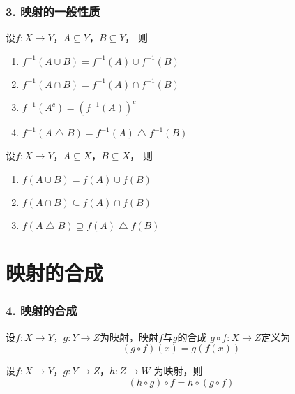 \documentclass{beamer}
\begin{document}
\begin{CJK*}{UTF8}{gbsn}
\begin{frame}
  \frametitle{3. 映射的一般性质}
  \begin{Thm}
    设$f:X\to Y$，$A \subseteq Y$，$B \subseteq Y$， 则
    \begin{enumerate}[(1)]
    \item $f^{-1}(A \cup B) = f^{-1}(A) \cup f^{-1}(B)$
    \item $f^{-1}(A \cap B) = f^{-1}(A) \cap f^{-1}(B)$
    \item $f^{-1}(A^c)=(f^{-1}(A))^c$
    \item $f^{-1}(A \bigtriangleup B) = f^{-1}(A) \bigtriangleup f^{-1}(B)$
    \end{enumerate}
  \end{Thm}
    \begin{Thm}
    设$f:X\to Y$，$A \subseteq X$，$B \subseteq X$， 则
    \begin{enumerate}[(1)]
    \item $f(A \cup B) = f(A) \cup f(B)$
    \item $f(A \cap B) \subseteq f(A) \cap f(B)$
    \item $f(A \bigtriangleup B) \supseteq f(A) \bigtriangleup f(B)$
    \end{enumerate}
  \end{Thm}

\end{frame}

\section{映射的合成}
\begin{frame}
  \frametitle{4. 映射的合成}
  \begin{Def}
    设$f:X\to Y$，$g:Y\to Z$为映射，映射$f$与$g$的\alert{合成} $g\circ f:X\to Z$定义为\[(g\circ f)(x) = g(f(x))\]
  \end{Def}
  \pause
\begin{Thm}
  设$f:X \to Y$，$g:Y\to Z$，$h:Z\to W$ 为映射，则 \[ (h \circ g) \circ f = h \circ (g \circ f) \]
\end{Thm}

\end{frame}


\end{CJK*}
\end{document}
